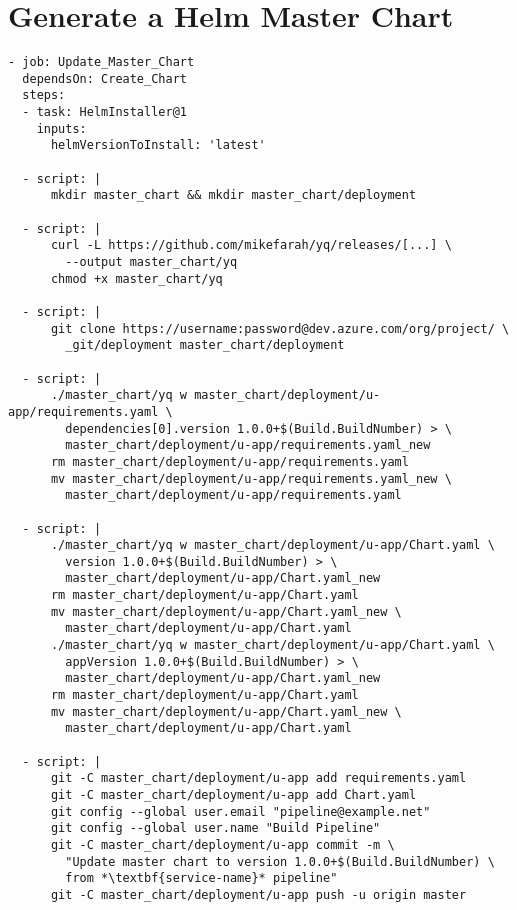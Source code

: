 
\section{Generate a Helm Master Chart}%
\label{Generate_a_Helm_Master_Chart}

\begin{longlisting}
  \begin{verbatim}
- job: Update_Master_Chart
  dependsOn: Create_Chart
  steps:
  - task: HelmInstaller@1
    inputs:
      helmVersionToInstall: 'latest'

  - script: |
      mkdir master_chart && mkdir master_chart/deployment

  - script: |
      curl -L https://github.com/mikefarah/yq/releases/[...] \
        --output master_chart/yq
      chmod +x master_chart/yq

  - script: |
      git clone https://username:password@dev.azure.com/org/project/ \
        _git/deployment master_chart/deployment

  - script: |
      ./master_chart/yq w master_chart/deployment/u-app/requirements.yaml \
        dependencies[0].version 1.0.0+$(Build.BuildNumber) > \ 
        master_chart/deployment/u-app/requirements.yaml_new
      rm master_chart/deployment/u-app/requirements.yaml
      mv master_chart/deployment/u-app/requirements.yaml_new \
        master_chart/deployment/u-app/requirements.yaml

  - script: |
      ./master_chart/yq w master_chart/deployment/u-app/Chart.yaml \
        version 1.0.0+$(Build.BuildNumber) > \
        master_chart/deployment/u-app/Chart.yaml_new
      rm master_chart/deployment/u-app/Chart.yaml
      mv master_chart/deployment/u-app/Chart.yaml_new \
        master_chart/deployment/u-app/Chart.yaml
      ./master_chart/yq w master_chart/deployment/u-app/Chart.yaml \
        appVersion 1.0.0+$(Build.BuildNumber) > \
        master_chart/deployment/u-app/Chart.yaml_new
      rm master_chart/deployment/u-app/Chart.yaml
      mv master_chart/deployment/u-app/Chart.yaml_new \
        master_chart/deployment/u-app/Chart.yaml

  - script: |
      git -C master_chart/deployment/u-app add requirements.yaml
      git -C master_chart/deployment/u-app add Chart.yaml
      git config --global user.email "pipeline@example.net"
      git config --global user.name "Build Pipeline"
      git -C master_chart/deployment/u-app commit -m \
        "Update master chart to version 1.0.0+$(Build.BuildNumber) \
        from *\textbf{service-name}* pipeline"
      git -C master_chart/deployment/u-app push -u origin master


\end{verbatim}
\end{longlisting}
